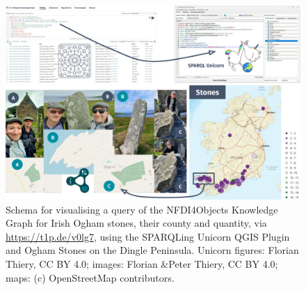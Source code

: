 \documentclass{eceasst}
\begin{document}
\begin{figure}[h!]
    \centering
    \includegraphics[width=0.95\linewidth]{ECEASST-LaTeX-Templates/img/Ogham KG Unicorn.png}
    \caption{Schema for visualising a query of the NFDI4Objects Knowledge Graph for Irish Ogham stones, their county and quantity, via \href{https://t1p.de/v0lg7}{https://t1p.de/v0lg7}, using the SPARQLing Unicorn QGIS Plugin and Ogham Stones on the Dingle Peninsula. Unicorn figures: Florian Thiery, CC BY 4.0; images: Florian \&Peter Thiery, CC BY 4.0; maps: (c) OpenStreetMap contributors.}
    \label{fig:unicorn_ogham}
\end{figure}
\end{document}
